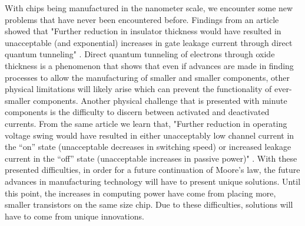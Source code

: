 \documentclass[12pt]{article}
\begin{document}
\begin{flushleft}
With chips being manufactured in the nanometer scale,
we encounter some new problems that have never been
encountered before. Findings from an article showed
that "Further reduction in insulator thickness would
have resulted in unacceptable (and exponential) increases
in gate leakage current through direct quantum tunneling"
\parencite{7878935}. Direct quantum tunneling of electrons
through oxide thickness is a phenomenon that shows
that even if advances are made in finding processes
to allow the manufacturing of smaller and smaller components,
other physical limitations will likely arise which
can prevent the functionality of ever-smaller components.
Another physical challenge that is presented with
minute components is the difficulty to discern between
activated and deactivated currents. From the same
article we learn that, "Further reduction in operating
voltage swing would have resulted in either unacceptably
low channel current in the “on” state (unacceptable
decreases in switching speed) or increased leakage
current in the “off” state (unacceptable increases
in passive power)" \parencite{7878935}. With these
presented difficulties, in order for a future continuation
of Moore's law, the future advances in manufacturing
technology will have to present unique solutions. Until
this point, the increases in computing power have come
from placing more, smaller transistors on the same size
chip. Due to these difficulties, solutions will have to
come from unique innovations.


\newpage


\newpage
\nocite{*}
\printbibliography

\end{flushleft}
\end{document}
